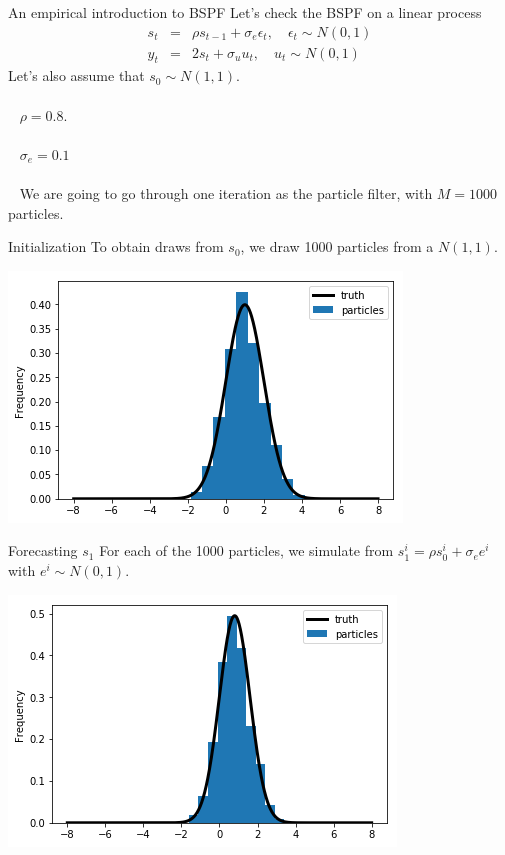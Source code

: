 \documentclass[presentation]{beamer}
\begin{document}
\begin{frame}[label={sec:org3acfa85}]{An empirical introduction to BSPF}
Let's check the BSPF on a linear process
\begin{eqnarray*}
s_t &=& \rho s_{t-1} + \sigma_{e} \epsilon_t, \quad \epsilon_t\sim N(0,1) \\
y_t &=& 2 s_t + \sigma_u u_t, \quad u_t \sim N(0,1)
\end{eqnarray*}
Let's also assume that \(s_0 \sim N(1,1)\).
\\~\\~  
\(\rho = 0.8\).
\\~\\~  
\(\sigma_{e} = 0.1\)
\\~\\~  
We are going to go through one iteration as the particle filter, with \(M = 1000\) particles.
\end{frame}
\begin{frame}[label={sec:org9c03384}]{Initialization}
To obtain draws from \(s_0\), we draw 1000 particles from a \(N(1,1)\). 
\begin{center}
\includegraphics[width=.9\linewidth]{initialization.png}
\end{center}
\end{frame}

\begin{frame}[label={sec:orgbe8d29d}]{Forecasting \(s_1\)}
For each of the 1000 particles, we simulate from \(s_1^i = \rho s_0^i + \sigma_e e^i\) with \(e^i \sim N(0,1)\).
\begin{center}
\includegraphics[width=.9\linewidth]{forecast.png}
\end{center}
\end{frame}
\end{document}
